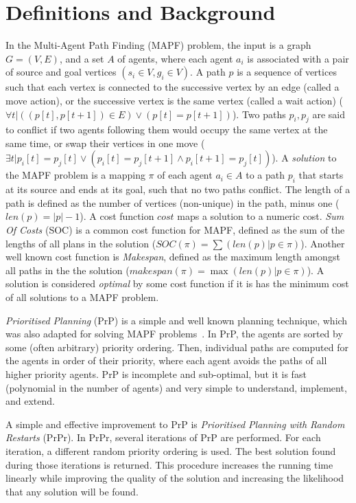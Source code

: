 \documentclass{article}
\newcommand{\soc}{SOC\xspace}
\newcommand{\len}{len\xspace}
\newcommand{\mkspn}{makespan\xspace}
\begin{document}
\section{Definitions and Background}

In the Multi-Agent Path Finding (MAPF) problem, the input is a graph $G=(V,E)$, and a set $A$ of agents, where each agent $a_i$ is associated with a pair of source and goal vertices $(s_i \in V,g_i \in V)$. A path $p$ is a sequence of vertices such that each vertex is connected to the successive vertex by an edge (called a move action), or the successive vertex is the same vertex (called a wait action) ($\forall t | ( (p[t], p[t+1]) \in E ) \lor ( p[t] = p[t+1] )$). Two paths $p_i, p_j$ are said to conflict if two agents following them would occupy the same vertex at the same time, or swap their vertices in one move ($\exists t | p_i[t] = p_j[t] \lor (p_i[t] = p_j[t+1] \land p_i[t+1] = p_j[t])$).
A \emph{solution} to the MAPF problem is a mapping $\pi$ of each agent $a_i\in A$ to a path $p_i$ that starts at its source and ends at its goal, such that no two paths conflict. 
The length of a path is defined as the number of vertices (non-unique) in the path, minus one ($\len(p) = |p| - 1$). A cost function $\mathit{cost}$ maps a solution to a numeric cost. \emph{Sum Of Costs} (\soc) is a common cost function for MAPF, defined as the sum of the lengths of all plans in the solution ($\soc(\pi) = \sum (\len(p) | p \in \pi)$). Another well known cost function is \emph{Makespan}, defined as the maximum length amongst all paths in the the solution ($\mkspn(\pi) = \max(\len(p) | p\in \pi)$). A solution is considered \emph{optimal} by some cost function if it is has the minimum cost of all solutions to a MAPF problem.

\emph{Prioritised Planning} (PrP) \cite{latombe1991multiple} is a simple and well known planning technique, which was also adapted for solving MAPF problems~\cite{silver2005cooperative}. In PrP, the agents are sorted by some (often arbitrary) priority ordering. Then, individual paths are computed for the agents in order of their priority, where each agent avoids the paths of all higher priority agents. PrP is incomplete and sub-optimal, but it is fast (polynomial in the number of agents) and very simple to understand, implement, and extend. 

A simple and effective improvement to PrP is \emph{Prioritised Planning with Random Restarts} (PrPr). In PrPr, several iterations of PrP are performed. For each iteration, a different random priority ordering is used. The best solution found during those iterations is returned. This procedure increases the running time linearly while improving the quality of the solution and increasing the likelihood that any solution will be found.
\end{document}
